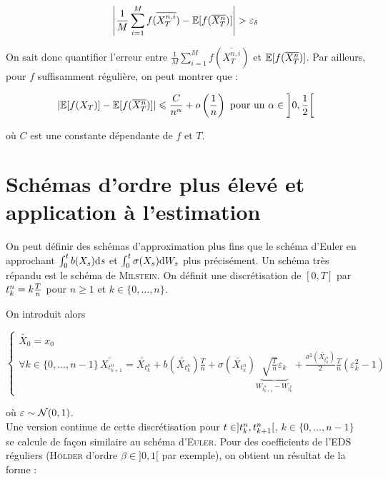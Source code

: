 \[ \left\vert \frac{1}{M} \sum_{i=1}^M f(\overline{X_T^{n,i}}) - \mathbb{E}[f(\overline{X_T^n})] \right\vert > \varepsilon_\delta \]

On sait donc quantifier l'erreur entre $ \frac{1}{M} \sum_{i=1}^M   f(\overline{X_T^{n,i}})$ et $\mathbb{E}[f(\overline{X_T^n})]$. Par ailleurs, pour $f$ suffisamment régulière, on peut montrer que :

\begin{equation*}
\begin{split}
  \vert \mathbb{E}[f(X_T)] - \mathbb{E}[f(\overline{X_T^n})] \vert \leqslant \frac{C}{n^\alpha} + o \left( \frac{1}{n} \right) \text{ pour un } \alpha \in \left]0, \frac{1}{2} \right[
\end{split}
\end{equation*}

où $C$ est une constante dépendante de $f$ et $T$.

\section{Schémas d'ordre plus élevé et application à l'estimation}

\newcommand{\xs}{X_s}
\newcommand{\ws}{W_s}

On peut définir des schémas d'approximation plus fins que le schéma d'Euler en approchant $ \int_{0}^{t} b(\xs) \der s$ et $ \int_{0}^{t} \sigma(\xs)\der \ws$ plus précisément.
Un schéma très répandu est le schéma de \textsc{Milstein}. On définit une discrétisation de $[0,T]$ par $t_k^n = k \frac{T}{n}$ pour $n \geq 1$ et $k \in \{0, \ldots, n \}$.

On introduit alors

\renewcommand{\xtkn}{\widetilde{X_{t_k^n}}}
\renewcommand{\xtkpn}{\widetilde{X_{t_{k+1}^n}}}
\newcommand{\wtkpn}{W_{t_{k+1}^n}}
\newcommand{\wtkn}{W_{t_{k}^n}}

\[
  \begin{cases}
    \widetilde{X_0} = x_0 \\
    \forall k \in \{ 0, \ldots, n-1 \} \, \xtkpn = \xtkn + b(\xtkn) \frac{T}{n} + \sigma( \xtkn) \underbrace{\sqrt{ \frac{T}{n} } \varepsilon_k}_{\wtkpn - \wtkn}  + \frac{\sigma^2(\xtkn)}{2} \frac{T}{n} ( \varepsilon^2_k - 1 )
  \end{cases}
\]

où $\varepsilon \sim \mathcal{N}(0,1)$. \\

Une version continue de cette discrétisation pour $t \in ] t_k^n, t_{k+1}^n[$, $k \in \{ 0, \ldots, n-1 \}$ se calcule de façon similaire au schéma d'\textsc{Euler}. Pour des coefficients de l'EDS réguliers (\textsc{Hölder} d'ordre $\beta \in ]0,1[$ par exemple), on obtient un résultat de la forme :

